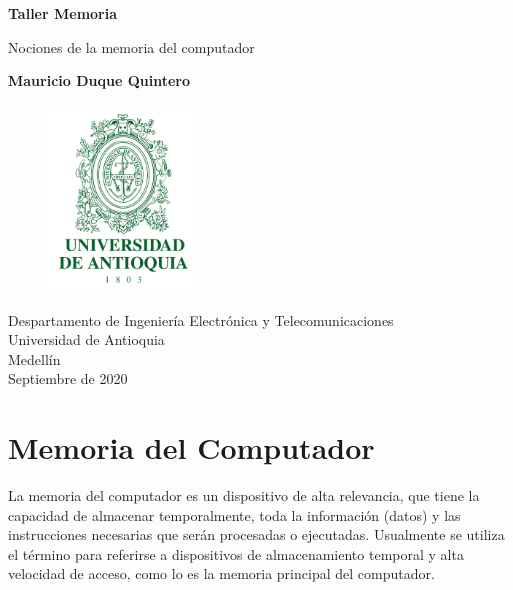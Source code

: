\documentclass{article}
\begin{document}
\begin{titlepage}
    \begin{center}
        \vspace*{1cm}
            
        \Huge
        \textbf{Taller Memoria }
            
        \vspace{0.5cm}
        \LARGE
        Nociones de la memoria del computador
            
        \vspace{2.5cm}
            
        \textbf{Mauricio Duque Quintero }
            
        \vfill
        \begin{figure}[h]
        \includegraphics[width=4cm]{Escudo-UdeA.png}
        \centering
        \label{fig:descarga}
        \end{figure}
     
        \vspace{0.8cm}
            
        \Large
        Despartamento de Ingeniería Electrónica y Telecomunicaciones\\
        Universidad de Antioquia\\
        Medellín\\
        Septiembre de 2020
            
    \end{center}
\end{titlepage}

\tableofcontents

\section{Memoria del Computador}
	La memoria del computador es un dispositivo de alta relevancia, que tiene la capacidad de almacenar temporalmente, toda la información (datos)  y  las instrucciones necesarias que serán procesadas o ejecutadas. Usualmente se utiliza el término para referirse a dispositivos de almacenamiento temporal y alta velocidad de acceso, como lo es la memoria principal del computador.
\end{document}
